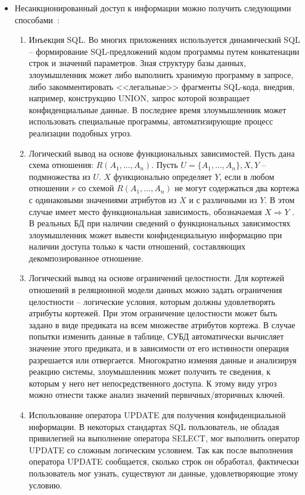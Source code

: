 \begin{itemize}
	\item Несанкционированный доступ к информации можно получить следующими способами~\label{ugr:conf}:
	\begin{enumerate}
		\item Инъекция SQL. Во многих приложениях используется динамический SQL -- формирование SQL-предложений кодом программы путем конкатенации строк и значений параметров. Зная структуру базы данных, злоумышленник может либо выполнить хранимую программу в запросе, либо закомментировать <<легальные>> фрагменты SQL-кода, внедрив, например, конструкцию UNION, запрос которой возвращает конфиденциальные данные. В последнее время злоумышленник может использовать специальные программы, автоматизирующие процесс реализации подобных угроз.

		\item Логический вывод на основе функциональных зависимостей. Пусть дана схема отношения: $R(A_1,\ldots,A_n)$. Пусть $U = \{A_1,\ldots,A_n\}, X ,Y$ -- подмножества из $U$. $X$ функционально определяет $Y$, если в любом отношении $r$ со схемой $R(A_1,\ldots,A_n)$ не могут содержаться два кортежа с одинаковыми значениями атрибутов из $X$ и с различными из $Y$. В этом случае имеет место функциональная зависимость, обозначаемая $X \Rightarrow Y$ . В реальных БД при наличии сведений о функциональных зависимостях злоумышленник может вывести конфиденциальную информацию при наличии доступа только к части отношений, составляющих декомпозированное отношение.

		\item Логический вывод на основе ограничений целостности. Для кортежей отношений в реляционной модели данных можно задать ограничения целостности -- логические условия, которым должны удовлетворять атрибуты кортежей. При этом ограничение целостности может быть задано в виде предиката на всем множестве атрибутов кортежа. В случае попытки изменить данные в таблице, СУБД автоматически вычисляет значение этого предиката, и в зависимости от его истинности операция разрешается или отвергается. Многократно изменяя данные и анализируя реакцию системы, злоумышленник может получить те сведения, к которым	у него нет непосредственного доступа. К этому виду угроз можно отнести также анализ значений первичных/вторичных ключей.

		\item Использование оператора UPDATE для получения конфиденциальной информации. В некоторых стандартах SQL пользователь, не обладая привилегией на выполнение оператора SELECT, мог выполнить оператор UPDATE со сложным логическим условием. Так как после выполнения оператора UPDATE сообщается, сколько строк он обработал, фактически пользователь мог узнать, существуют ли данные, удовлетворяющие этому условию.


\end{enumerate}
\end{itemize}
